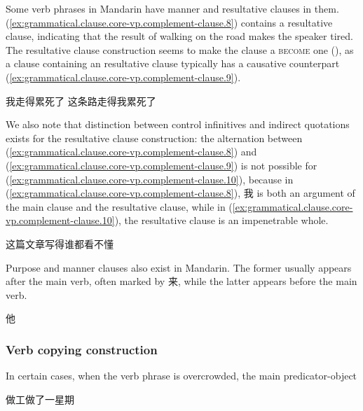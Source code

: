 \documentclass[UTF8, a4paper, oneside, scheme=plain, 12pt]{ctexrep}
\newcommand*{\category}[1]{\textsc{#1}}
\begin{document}
Some verb phrases in Mandarin have manner and resultative clauses in them.
(\ref{ex:grammatical.clause.core-vp.complement-clause.8}) contains a resultative clause,
indicating that the result of walking on the road makes the speaker tired.
The resultative clause construction seems to make the clause a \category{become} one
(),
as a clause containing an resultative clause typically has a causative counterpart
(\ref{ex:grammatical.clause.core-vp.complement-clause.9}).

\begin{exe}
    \ex\label{ex:grammatical.clause.core-vp.complement-clause.8} 我走得累死了
    \ex\label{ex:grammatical.clause.core-vp.complement-clause.9} 这条路走得我累死了
\end{exe}

We also note that distinction between control infinitives and indirect quotations
exists for the resultative clause construction:
the alternation between (\ref{ex:grammatical.clause.core-vp.complement-clause.8})
and (\ref{ex:grammatical.clause.core-vp.complement-clause.9}) is not possible for 
(\ref{ex:grammatical.clause.core-vp.complement-clause.10}),
because in (\ref{ex:grammatical.clause.core-vp.complement-clause.8}),
我 is both an argument of the main clause and the resultative clause,
while in (\ref{ex:grammatical.clause.core-vp.complement-clause.10}),
the resultative clause is an impenetrable whole.

\begin{exe}
    \ex\label{ex:grammatical.clause.core-vp.complement-clause.10} 这篇文章写得谁都看不懂
\end{exe}

Purpose and manner clauses also exist in Mandarin.
The former usually appears after the main verb, often marked by 来,
while the latter appears before the main verb.

\begin{exe}
    \ex 他
\end{exe}

\subsubsection{Verb copying construction}

In certain cases, when the verb phrase is overcrowded,
the main predicator-object 

\begin{exe}
    \ex\label{ex:grammatical.clause.core-vp.verb-copying} 做工做了一星期
\end{exe}
\end{document}
